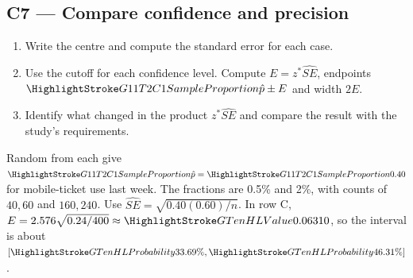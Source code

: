 \subsection{C7 --- Compare confidence and precision}\label{crit:c7}
\begin{enumerate}
  \item Write the centre and compute the standard error for each case.
  \item Use the cutoff for each confidence level. Compute \(E=z^*\widehat{SE}\), endpoints \(\SampleShare{\hat p}\pm E\) and width \(2E\).
  \item Identify what changed in the product \(z^*\widehat{SE}\) and compare the result with the study's requirements.
\end{enumerate}

\clearpage
\enlargethispage{12pt}
 Random  from  each give \(\SampleShare{\hat p}=\SampleShare{0.40}\) for mobile-ticket use last week. The fractions are 0.5\% and 2\%, with counts of \(40,60\) and \(160,240\). Use \(\widehat{SE}=\sqrt{0.40(0.60)/n}\). In row C, \(E=2.576\sqrt{0.24/400}\approx\Margin{0.06310}\), so the interval is about \([\Endpoint{33.69\%},\Endpoint{46.31\%}]\).

